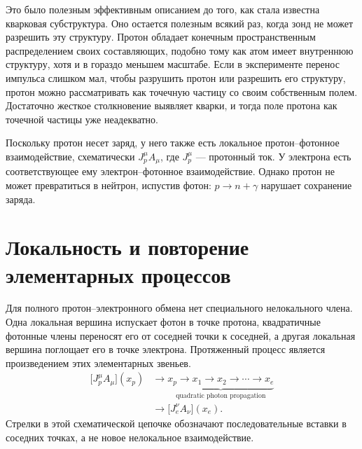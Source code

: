 Это было полезным эффективным описанием до того, как стала известна кварковая субструктура. Оно остается полезным всякий раз, когда зонд не может разрешить эту структуру. Протон обладает конечным пространственным распределением своих составляющих, подобно тому как атом имеет внутреннюю структуру, хотя и в гораздо меньшем масштабе. Если в эксперименте перенос импульса слишком мал, чтобы разрушить протон или разрешить его структуру, протон можно рассматривать как точечную частицу со своим собственным полем. Достаточно жесткое столкновение выявляет кварки, и тогда поле протона как точечной частицы уже неадекватно.

Поскольку протон несет заряд, у него также есть локальное протон--фотонное взаимодействие, схематически \(J_p^\mu A_\mu\), где \(J_p^\mu\) — протонный ток. У электрона есть соответствующее ему электрон--фотонное взаимодействие. Однако протон не может превратиться в нейтрон, испустив фотон: \(p\to n+\gamma\) нарушает сохранение заряда.

\begin{classroomqa}
\end{classroomqa}

\section{Локальность и повторение элементарных процессов}

Для полного протон--электронного обмена нет специального нелокального члена. Одна локальная вершина испускает фотон в точке протона, квадратичные фотонные члены переносят его от соседней точки к соседней, а другая локальная вершина поглощает его в точке электрона. Протяженный процесс является произведением этих элементарных звеньев.
\begin{equation}
\begin{aligned}
\bigl[J_p^\mu A_\mu\bigr](x_p)
&\longrightarrow
\underbrace{x_p\to x_1\to x_2\to\cdots\to x_e}_{\text{quadratic photon propagation}}
\\
&\longrightarrow
\bigl[J_e^\nu A_\nu\bigr](x_e).
\end{aligned}
\end{equation}
Стрелки в этой схематической цепочке обозначают последовательные вставки в соседних точках, а не новое нелокальное взаимодействие.

